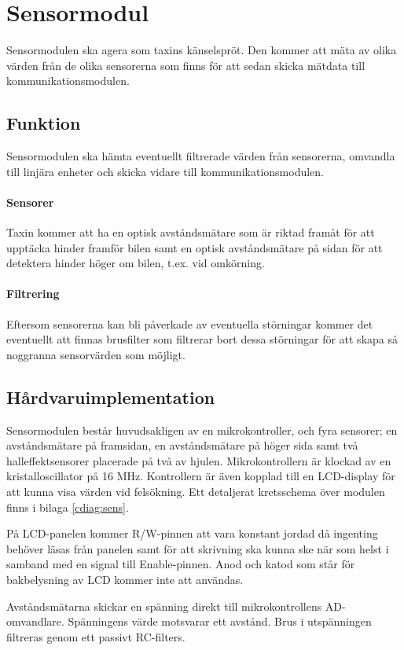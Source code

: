 \documentclass[designspec/spec.tex]{subfiles}
\begin{document}
\section{Sensormodul}
Sensormodulen ska agera som taxins känselspröt. Den kommer att mäta av olika
värden från de olika sensorerna som finns för att sedan skicka mätdata till
kommunikationsmodulen.

\subsection{Funktion}
Sensormodulen ska hämta eventuellt filtrerade värden från sensorerna, omvandla
till linjära enheter och skicka vidare till kommunikationsmodulen.

\paragraph{Sensorer} Taxin kommer att ha en optisk avståndsmätare som är riktad
framåt för att upptäcka hinder framför bilen samt en optisk avståndsmätare på
sidan för att detektera hinder höger om bilen, t.ex. vid omkörning.

\paragraph{Filtrering} Eftersom sensorerna kan bli påverkade av eventuella
störningar kommer det eventuellt att finnas brusfilter som filtrerar bort dessa
störningar för att skapa så noggranna sensorvärden som möjligt.

\subsection{Hårdvaruimplementation} Sensormodulen består huvudsakligen av en
mikrokontroller, och fyra sensorer; en avståndsmätare på framsidan, en
avståndsmätare på höger sida samt två halleffektsensorer placerade på två av
hjulen. Mikrokontrollern är klockad av en kristalloscillator på 16 MHz.
Kontrollern är även kopplad till en LCD-display för att kunna visa värden vid
felsökning. Ett detaljerat kretsschema över modulen finns i bilaga
\ref{cdiag:sens}.

På LCD-panelen kommer R/W-pinnen att vara konstant jordad då ingenting behöver
läsas från panelen samt för att skrivning ska kunna ske när som helst i samband
med en signal till Enable-pinnen. Anod och katod som står för bakbelysning av
LCD kommer inte att användas.

Avståndsmätarna skickar en spänning direkt till mikrokontrollens AD-omvandlare.
Spänningens värde motsvarar ett avstånd. Brus i utspänningen filtreras genom
ett passivt RC-filters.
\end{document}
